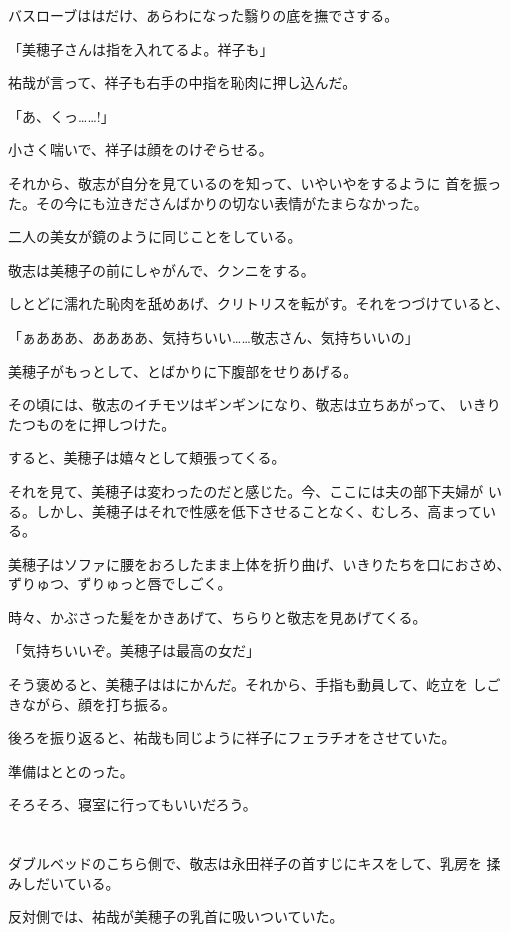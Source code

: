 ﻿\documentclass[
    book,tate,
    line_length=30zw,
    jafontsize=12pt,
    paper=b5j,
    landscape,
    ]{jlreq}
\begin{document}
バスローブははだけ、あらわになった翳りの底を撫でさする。

「美穂子さんは指を入れてるよ。祥子も」

祐哉が言って、祥子も右手の中指を恥肉に押し込んだ。

「あ、くっ……!」

小さく喘いで、祥子は顔をのけぞらせる。

それから、敬志が自分を見ているのを知って、いやいやをするように
首を振った。その今にも泣きださんばかりの切ない表情がたまらなかった。

二人の美女が鏡のように同じことをしている。

敬志は美穂子の前にしゃがんで、クンニをする。

しとどに濡れた恥肉を舐めあげ、クリトリスを転がす。それをつづけていると、

「ぁあああ、ああああ、気持ちいい……敬志さん、気持ちいいの」

美穂子がもっとして、とばかりに下腹部をせりあげる。

その頃には、敬志のイチモツはギンギンになり、敬志は立ちあがって、
いきりたつものをに押しつけた。

すると、美穂子は嬉々として頬張ってくる。

それを見て、美穂子は変わったのだと感じた。今、ここには夫の部下夫婦が
いる。しかし、美穂子はそれで性感を低下させることなく、むしろ、高まっている。

美穂子はソファに腰をおろしたまま上体を折り曲げ、いきりたちを口におさめ、
ずりゅつ、ずりゅっと唇でしごく。

時々、かぶさった髪をかきあげて、ちらりと敬志を見あげてくる。

「気持ちいいぞ。美穂子は最高の女だ」

そう褒めると、美穂子ははにかんだ。それから、手指も動員して、屹立を
しごきながら、顔を打ち振る。

後ろを振り返ると、祐哉も同じように祥子にフェラチオをさせていた。

準備はととのった。

そろそろ、寝室に行ってもいいだろう。

\section*{}

ダブルベッドのこちら側で、敬志は永田祥子の首すじにキスをして、乳房を
揉みしだいている。

反対側では、祐哉が美穂子の乳首に吸いついていた。
\end{document}
